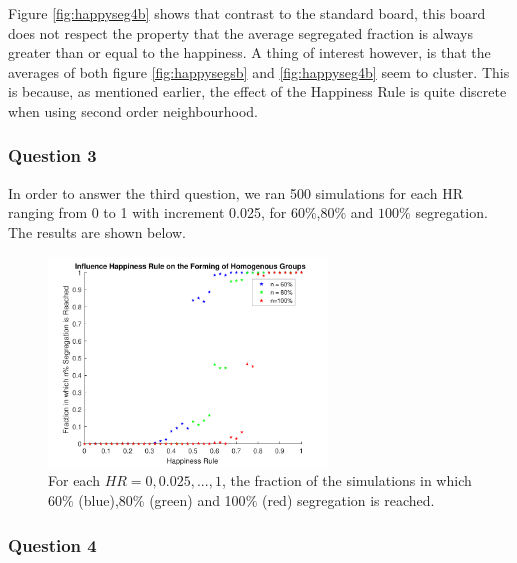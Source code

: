 Figure \ref{fig:happyseg4b} shows that contrast to the standard board, this board does not respect the property that the average segregated fraction is always greater than or equal to the happiness. 
A thing of interest however, is that the averages of both figure \ref{fig:happysegsb} and \ref{fig:happyseg4b} seem to cluster. 
This is because, as mentioned earlier, the effect of the Happiness Rule is quite discrete when using second order neighbourhood.

\subsubsection{Question 3}
In order to answer the third question, we ran 500 simulations for each HR ranging from 0 to 1 with increment 0.025, for $60\%$,$80\%$ and $100\%$ segregation.\\
The results are shown below.
\begin{figure}[H]
    \centering
    \includegraphics[width=280px]{happy_segr_60_80_100.pdf}
    \caption{For each $HR = 0,0.025,...,1$, the fraction of the simulations in which 60$\%$ (blue),80$\%$ (green) and 100$\%$ (red) segregation is reached.}
    \label{fig:happysegsc}
\end{figure}


\subsubsection{Question 4}

